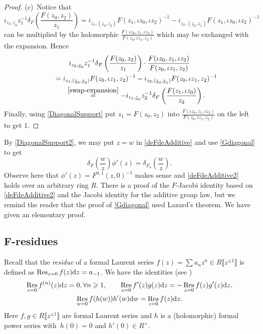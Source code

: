 \documentclass[10pt,a4paper]{amsart}
\numberwithin{equation}{section}
\theoremstyle{definition}
\DeclareMathOperator\Res{Res}
\def\lb{\llbracket}
\def\rb{\rrbracket}
\begin{document}
\begin{proof}
(c)~Notice that
\[
 i_{z_2,\underline z_0}z_1^{-1}\delta_F\left(\frac{F(z_0,z_2)}{z_1}\right)
=i_{z_1,(\underline z_0, \underline z_2)}F(z_1,\iota z_0,\iota z_2)^{-1} - i_{z_2,(\underline z_0, \underline z_1)}F(z_1,\iota z_0, \iota z_2)^{-1}
\]
can be multiplied by the holomorphic $\frac{F(\iota z_0,z_1,\iota z_2)}{F(z_0, \iota z_1, z_2)}$ which may be exchanged with the expansion. Hence
\begin{gather*}
 i_{z_2,\underline z_0}z_1^{-1}\delta_F\left(\frac{F(z_0,z_2)}{z_1}\right)\cdot\frac{F(\iota z_0,z_1,\iota z_2)}{F(z_0, \iota z_1, z_2)}\\
\qquad=i_{z_1,(\underline z_0, \underline z_2)}F(z_0,\iota z_1, z_2)^{-1} - i_{z_2,(\underline z_0, \underline z_1)}F(z_0,\iota z_1, z_2)^{-1}\\
\qquad\overset{\eqref{swap-expansion}}{=}-i_{z_1,\underline z_0}z_2^{-1}\delta_F\left(\frac{F(z_1,\iota z_0)}{z_2}\right).
\end{gather*}
Finally, using \eqref{DiagonalSupport} put $z_1=F(z_0,z_2)$ into $\frac{F(\iota z_0,z_1,\iota z_2)}{F(z_0, \iota z_1, z_2)}$ on the left to get $1$.
\end{proof}

By \eqref{DiagonalSupport2}, we may put $z=w$ in \eqref{deFdeAdditive} and use \eqref{Gdiagonal} to get
\begin{equation}
\label{deFdeAdditive2}
 \delta_F\left(\frac{w}{z}\right)\phi'(z)=\delta_{F_a}\left(\frac{w}{z}\right).
\end{equation}
Observe here that $\phi'(z)=F^{0,1}(z,0)^{-1}$ makes sense and \eqref{deFdeAdditive2} holds over an arbitrary ring $R$. There is a proof of the $F$-Jacobi identity based on \eqref{deFdeAdditive2} and the Jacobi identity for the additive group law, but we remind the reader that the proof of \eqref{Gdiagonal} used Lazard's theorem. We have given an elementary proof.

\subsection[F-residues]{$\boldsymbol{F}$-residues}
\label{s37}

Recall that the \emph{residue} of a formal Laurent series $f(z)=\sum a_nz^n\in R\big\lb z^{\pm1}\big\rb$ is defined as $\Res_{z=0} f(z){\rm d}z=a_{-1}$. We have the identities (see \cite[Chapter~13]{Rem})
\begin{gather}%
\Res_{z=0} f^{(n)}(z){\rm d}z=0, \forall n\geqslant1,\qquad
\Res_{z=0} f'(z)g(z){\rm d}z=-\Res_{z=0} f(z)g'(z){\rm d}z,\nonumber\\
\Res_{w=0} f(h(w))h'(w){\rm d}w=\Res_{z=0} f(z){\rm d}z.\label{s2eqn3}
\end{gather}
Here $f,g\in R\big\lb z^{\pm1}\big\rb$ are formal Laurent series and $h$ is a (holomorphic) formal power series with~${h(0)=0}$ and $h'(0)\in R^\times$.\medskip
\end{document}
